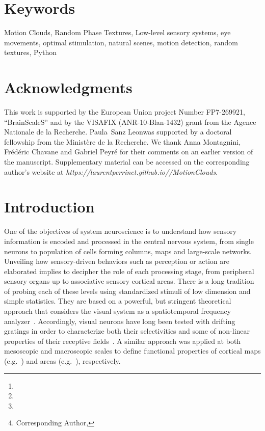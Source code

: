 \documentclass[a4paper,11pt]{article}%
\title{\Title}%
\author[1,2]{\AuthorA \thanks{\EmailA}}
\author[1,2]{\AuthorB \thanks{\EmailB}}
\author[1,2]{\AuthorC \thanks{\EmailC}}
\author[1,2]{\AuthorD \thanks{Corresponding Author, \EmailD}}%
\affil[1]{\AddressA}
\affil[2]{\AddressB}
\date{}%
\newcommand{\AuthorA}{Paula~Sanz Leon}%
\newcommand{\Website}{https://laurentperrinet.github.io/}%
\newcommand{\Abstract}{%
Choosing an appropriate set of stimuli is essential in order to characterize the response of a sensory system to a particular functional dimension, such as the eye movement following the motion of a visual scene. %
Here, we describe a framework to generate random texture movies with controlled information content, i.e., Motion Clouds. These stimuli are defined using a generative model which is based on controlled experimental parametrization. %
We show that Motion Clouds correspond to dense mixing of localized moving gratings with random positions. Their global envelope is similar to natural-like stimulation with an approximate full-field translation corresponding to a retinal slip. %
We describe the construction of these stimuli mathematically and propose an open-source python-based implementation. %
Examples of the use of this framework are shown. We also propose extensions to other modalities such as color vision, touch and audition.%
}%
\newcommand{\Keywords}%
{Motion Clouds, Random Phase Textures, Low-level sensory systems, eye movements, optimal stimulation, natural scenes, motion detection, random textures, Python}
\newcommand{\Acknowledgments}{%
This work is supported by the European Union project Number FP7-269921, ``BrainScaleS'' and by the VISAFIX (ANR-10-Blan-1432)  grant from the Agence Nationale de la Recherche. \AuthorA was supported by a doctoral fellowship from the Minist{\`e}re de la Recherche. We thank Anna Montagnini, Fr\'ed\'eric Chavane and Gabriel Peyr\'e for their comments on an earlier version of the manuscript. Supplementary material can be accessed on the corresponding author's website at \textit{\Website/MotionClouds}.}%
\begin{document}
\maketitle
\begin{abstract}
\Abstract
\end{abstract}%
\section*{Keywords}
\Keywords
\section*{Acknowledgments}
\Acknowledgments
\section{Introduction }\label{intro}

One of the objectives of system neuroscience is to understand how sensory information is encoded and processed in the central nervous system, from single neurons to population of cells forming columns, maps and large-scale networks. Unveiling how sensory-driven behaviors such as perception or action are elaborated implies to decipher the role of each processing stage, from peripheral sensory organs up to associative sensory cortical areas. There is a long tradition of probing each of these levels using standardized stimuli of low dimension and simple statistics. They are based on a powerful, but stringent theoretical approach that considers the visual system as a spatiotemporal frequency analyzer~\citep{Graham79,Watson83}. Accordingly, visual neurons have long been tested with drifting gratings in order to characterize both their selectivities and some of non-linear properties of their receptive fields~\citep{DeValois1988Spatial}. A similar approach was applied at both mesoscopic and macroscopic scales to define functional properties of cortical maps (e.g.~\citep{Blasdel86,TsO90}) and areas (e.g.~\citep{Singh2000Spatiotemporal,Henriksson08}), respectively.  
\end{document}
